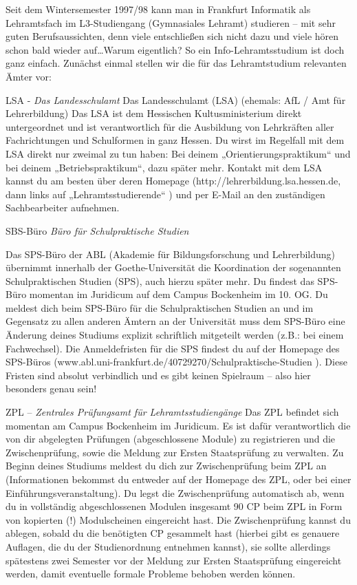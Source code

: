 Seit dem Wintersemester 1997/98 kann man in Frankfurt Informatik als Lehramtsfach im L3-Studiengang (Gymnasiales Lehramt) studieren – mit sehr guten Berufsaussichten, denn viele entschließen sich nicht dazu und viele hören schon bald wieder auf\ldots Warum eigentlich? So ein Info-Lehramtsstudium ist doch ganz einfach. Zunächst einmal stellen wir die für das Lehramtstudium relevanten Ämter vor:


LSA - \textit{Das Landesschulamt}
Das Landesschulamt (LSA) (ehemals: AfL / Amt für Lehrerbildung)
Das LSA ist dem Hessischen Kultusministerium direkt untergeordnet und ist verantwortlich für die Ausbildung von Lehrkräften aller Fachrichtungen und Schulformen in ganz Hessen.
Du wirst im Regelfall mit dem LSA direkt nur zweimal zu tun haben: Bei deinem „Orientierungspraktikum“ und bei deinem „Betriebspraktikum“, dazu später mehr.
Kontakt mit dem LSA kannst du am besten über deren Homepage (http://lehrerbildung.lsa.hessen.de, dann links auf „Lehramtsstudierende“ ) und per E-Mail an den zuständigen Sachbearbeiter aufnehmen.


SBS-Büro \textit{Büro für Schulpraktische Studien}

Das SPS-Büro der ABL (Akademie für Bildungsforschung und Lehrerbildung) übernimmt innerhalb der Goethe-Universität die Koordination der sogenannten Schulpraktischen Studien (SPS), auch hierzu später mehr. Du findest das SPS-Büro momentan im Juridicum auf dem Campus Bockenheim im 10. OG.
Du meldest dich beim SPS-Büro für die Schulpraktischen Studien an und im Gegensatz zu allen anderen Ämtern an der Universität muss dem SPS-Büro eine Änderung deines Studiums explizit schriftlich mitgeteilt werden (z.B.: bei einem Fachwechsel). Die Anmeldefristen für die SPS findest du auf der Homepage des SPS-Büros (www.abl.uni-frankfurt.de/40729270/Schulpraktische-Studien ). Diese Fristen sind absolut verbindlich und es gibt keinen Spielraum – also hier besonders genau sein!


ZPL – \textit{Zentrales Prüfungsamt für Lehramtsstudiengänge}
Das ZPL befindet sich momentan am Campus Bockenheim im Juridicum. Es ist dafür verantwortlich die von dir abgelegten Prüfungen (abgeschlossene Module) zu registrieren und die Zwischenprüfung, sowie die Meldung zur Ersten Staatsprüfung zu verwalten.
Zu Beginn deines Studiums meldest du dich zur Zwischenprüfung beim ZPL an (Informationen bekommst du entweder auf der Homepage des ZPL, oder bei einer Einführungsveranstaltung). Du legst die Zwischenprüfung automatisch ab, wenn du in vollständig abgeschlossenen Modulen insgesamt 90 CP beim ZPL in Form von kopierten (!) Modulscheinen eingereicht hast.
Die Zwischenprüfung kannst du ablegen, sobald du die benötigten CP gesammelt hast (hierbei gibt es genauere Auflagen, die du der Studienordnung entnehmen kannst), sie sollte allerdings spätestens zwei Semester vor der Meldung zur Ersten Staatsprüfung eingereicht werden, damit eventuelle formale Probleme behoben werden können.\\

